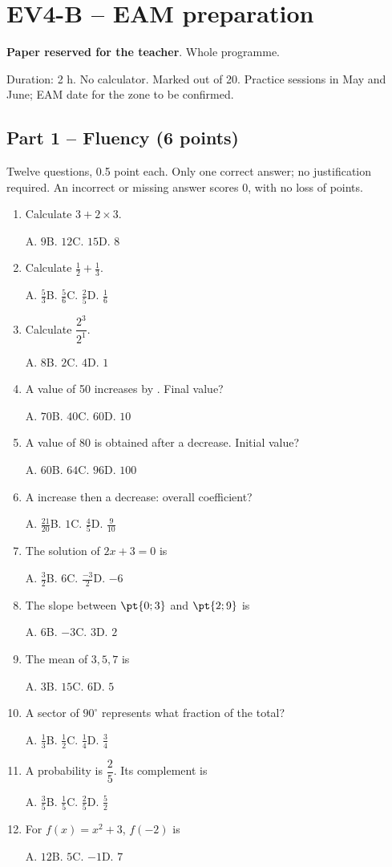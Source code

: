 \mxnewpage\section*{EV4-B -- EAM preparation}\label{EV4-B}
\textbf{Paper reserved for the teacher}. Whole programme.\par Duration: 2 h. No calculator. Marked out of 20. Practice sessions in May and June; EAM date for the zone to be confirmed.
\subsection*{Part 1 -- Fluency (6 points)}
Twelve questions, \num{0,5} point each. Only one correct answer; no justification required. An incorrect or missing answer scores 0, with no loss of points.
\begin{enumerate}
\item Calculate $3+2\times3$.\par A. $9$\quad B. $12$\quad C. $15$\quad D. $8$
\item Calculate $\frac12+\frac13$.\par A. $\frac{5}{3}$\quad B. $\frac{5}{6}$\quad C. $\frac{2}{5}$\quad D. $\frac{1}{6}$
\item Calculate $\dfrac{2^3}{2^{1}}$.\par A. $8$\quad B. $2$\quad C. $4$\quad D. $1$
\item A value of 50 increases by . Final value?\par A. $70$\quad B. $40$\quad C. $60$\quad D. $10$
\item A value of 80 is obtained after a  decrease. Initial value?\par A. $60$\quad B. $64$\quad C. $96$\quad D. $100$
\item A  increase then a  decrease: overall coefficient?\par A. $\frac{21}{20}$\quad B. $1$\quad C. $\frac{4}{5}$\quad D. $\frac{9}{10}$
\item The solution of $2x+3=0$ is\par A. $\frac{3}{2}$\quad B. $6$\quad C. $\frac{-3}{2}$\quad D. $-6$
\item The slope between $\pt{0;3}$ and $\pt{2;9}$ is\par A. $6$\quad B. $-3$\quad C. $3$\quad D. $2$
\item The mean of $3, 5, 7$ is\par A. $3$\quad B. $15$\quad C. $6$\quad D. $5$
\item A sector of $90^\circ$ represents what fraction of the total?\par A. $\frac{1}{3}$\quad B. $\frac{1}{2}$\quad C. $\frac{1}{4}$\quad D. $\frac{3}{4}$
\item A probability is $\dfrac{2}{5}$. Its complement is\par A. $\frac{3}{5}$\quad B. $\frac{1}{5}$\quad C. $\frac{2}{5}$\quad D. $\frac{5}{2}$
\item For $f(x)=x^2+3$, $f(-2)$ is\par A. $12$\quad B. $5$\quad C. $-1$\quad D. $7$
\end{enumerate}

